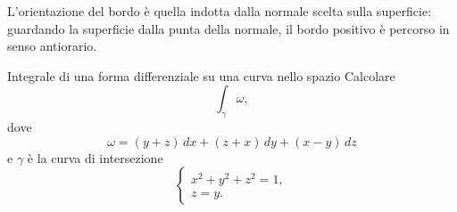 \documentclass[a4paper]{article}
\begin{document}
\begin{radioactive}
L'orientazione del bordo è quella indotta dalla normale scelta sulla superficie: guardando la superficie dalla punta della normale, il bordo positivo è percorso in senso antiorario.
\end{radioactive}
\begin{radioactive}
\begin{snippetexample}{Integrale di una forma differenziale su una curva nello spazio}
    Calcolare
    \[
        \int_\gamma \omega,
    \]
    dove
    \[
        \omega=(y+z)\,dx+(z+x)\,dy+(x-y)\,dz
    \]
    e \(\gamma\) è la curva di intersezione
    \[
        \begin{cases}
            x^2+y^2+z^2=1,\\
            z=y.
        \end{cases}
    \]
\end{snippetexample}
\end{radioactive}
\end{document}
